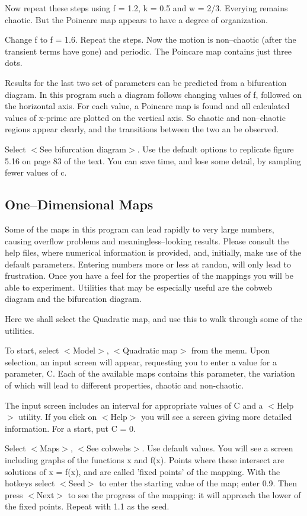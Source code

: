    Now repeat these steps using f = 1.2, k = 0.5 and w = 2/3. Everying
remains chaotic. But the Poincare map appears to have a degree of
organization.

   Change f to f = 1.6. Repeat the steps. Now the motion is non--chaotic
(after the transient terms have gone) and periodic. The Poincare map
contains just three dots.

   Results for the last two set of parameters can be predicted from a
bifurcation diagram. In this program such a diagram follows changing
values of f, followed on the horizontal axis. For each value, a Poincare
map is found and all calculated values of x-prime are plotted on the
vertical axis. So chaotic and non--chaotic regions appear clearly, and
the transitions between the two an be observed.

   Select $<$See bifurcation diagram$>$. Use the default options to replicate
figure 5.16 on page 83 of the text. You can save time, and lose some
detail, by sampling fewer values of c.


\subsection{One--Dimensional Maps}

   Some of the maps in this program can lead rapidly to very large
numbers, causing overflow problems and meaningless--looking results.
Please consult the help files, where numerical information is provided,
and, initially, make use of the default parameters. Entering numbers
more or less at randon, will only lead to frustration. Once you have a
feel for the properties of the mappings you will be able to experiment.
Utilities that may be especially useful are the cobweb diagram and the
bifurcation diagram.

   Here we shall select the Quadratic map, and use this to walk through
some of the utilities.

   To start, select $<$Model$>$, $<$Quadratic map$>$ from the menu. Upon selection,
an input screen will appear, requesting you to enter a value for a
parameter, C. Each of the available maps contains this parameter, the
variation of which will lead to different properties, chaotic and non-chaotic.

   The input screen includes an interval for appropriate values of C and
a $<$Help$>$ utility. If you click on $<$Help$>$ you will see a screen giving
more detailed information. For a start, put C = 0.

   Select $<$Maps$>$, $<$See cobwebs$>$. Use default values. You will see a
screen including graphs of the functions x and f(x). Points where these
intersect are solutions of x = f(x), and are called 'fixed points' of the
mapping. With the hotkeys select $<$Seed$>$ to enter the starting value of
the map; enter 0.9. Then press $<$Next$>$ to see the progress of the mapping:
it will approach the lower of the fixed points. Repeat with 1.1 as the seed.

